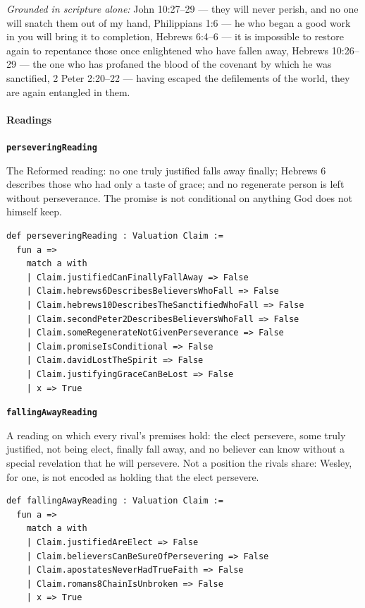 \documentclass[11pt]{article}
\begin{document}
\emph{Grounded in scripture alone:} John 10:27–29 — they will never perish, and no one will snatch them out of my hand, Philippians 1:6 — he who began a good work in you will bring it to completion, Hebrews 6:4–6 — it is impossible to restore again to repentance those once enlightened who have fallen away, Hebrews 10:26–29 — the one who has profaned the blood of the covenant by which he was sanctified, 2 Peter 2:20–22 — having escaped the defilements of the world, they are again entangled in them.
\paragraph*{Readings}
\leavevmode\par\nobreak
\par\medskip\noindent\textbf{\texttt{persevering\allowbreak{}Reading}}\par\nobreak\noindent
The Reformed reading: no one truly justified falls away finally; Hebrews 6 describes those who had only a taste of grace; and no regenerate person is left without perseverance. The promise is not conditional on anything God does not himself keep.

{\small\begin{verbatim}
def perseveringReading : Valuation Claim :=
  fun a =>
    match a with
    | Claim.justifiedCanFinallyFallAway => False
    | Claim.hebrews6DescribesBelieversWhoFall => False
    | Claim.hebrews10DescribesTheSanctifiedWhoFall => False
    | Claim.secondPeter2DescribesBelieversWhoFall => False
    | Claim.someRegenerateNotGivenPerseverance => False
    | Claim.promiseIsConditional => False
    | Claim.davidLostTheSpirit => False
    | Claim.justifyingGraceCanBeLost => False
    | x => True
\end{verbatim}}
\par\medskip\noindent\textbf{\texttt{falling\allowbreak{}Away\allowbreak{}Reading}}\par\nobreak\noindent
A reading on which every rival’s premises hold: the elect persevere, some truly justified, not being elect, finally fall away, and no believer can know without a special revelation that he will persevere. Not a position the rivals share: Wesley, for one, is not encoded as holding that the elect persevere.

{\small\begin{verbatim}
def fallingAwayReading : Valuation Claim :=
  fun a =>
    match a with
    | Claim.justifiedAreElect => False
    | Claim.believersCanBeSureOfPersevering => False
    | Claim.apostatesNeverHadTrueFaith => False
    | Claim.romans8ChainIsUnbroken => False
    | x => True
\end{verbatim}}
\end{document}
